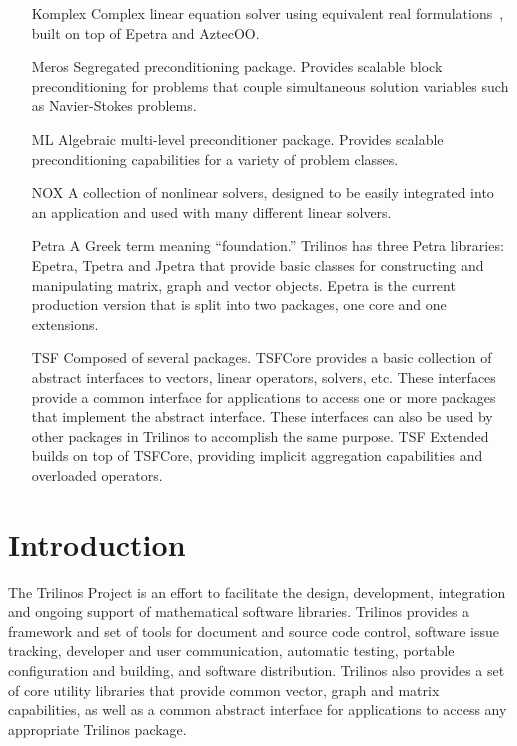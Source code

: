 \documentclass[12pt,relax]{TrilinosDevGuide}
\begin{document}
\begin{itemize}
\item[Komplex] 
Complex linear equation solver using equivalent real 
formulations~\cite{DayHero2000}, built on top of Epetra and AztecOO.

\item[Meros]
Segregated preconditioning package.  Provides scalable block
preconditioning for problems that couple simultaneous solution
variables such as Navier-Stokes problems.

\item[ML]
Algebraic multi-level preconditioner package.  Provides scalable
preconditioning capabilities for a variety of problem classes.

\item[NOX]
A collection of nonlinear solvers, designed to be easily integrated
into an application and used with many different linear solvers.

\item[Petra]
A Greek term meaning ``foundation.''  Trilinos has three Petra 
libraries: Epetra, Tpetra and Jpetra that provide basic classes 
for constructing and manipulating matrix, graph and vector
objects.  Epetra is the current production version that is
split into two packages, one core and one extensions.

\item[TSF]
Composed of several packages.  TSFCore provides 
a basic collection of abstract interfaces to vectors, linear
operators, solvers, etc.  These interfaces provide a common
interface for applications to access one or more packages that
implement the abstract interface.  These interfaces can also be used
by other packages in Trilinos to accomplish the same purpose.
TSF Extended builds on top of TSFCore, providing implicit
aggregation capabilities and overloaded operators.

\end{itemize}


\section{Introduction}
\label{Section:Introduction}
The Trilinos Project is an effort to facilitate the design, development,
integration and ongoing support of mathematical software libraries.  Trilinos 
provides a framework and set of tools for document and source code control,
software issue tracking, developer and user communication, automatic
testing, portable configuration and building, and software
distribution.  Trilinos also provides a set of core utility libraries
that provide common vector, graph and matrix capabilities, as well as
a common abstract interface for applications to access any appropriate
Trilinos package.
\end{document}
